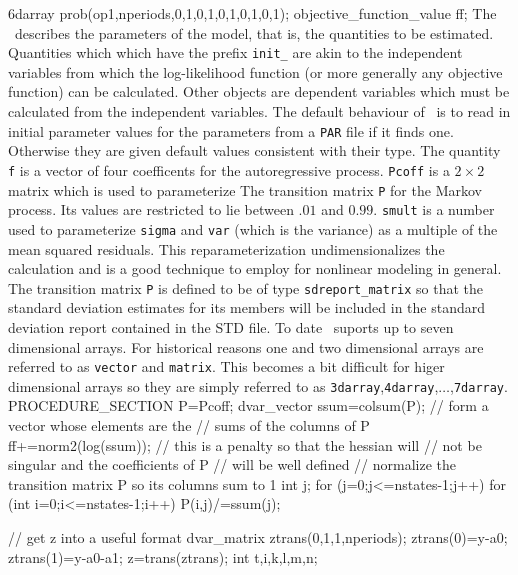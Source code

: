 \documentclass[12pt]{book}
\begin{document}
  6darray prob(op1,nperiods,0,1,0,1,0,1,0,1,0,1);
  objective_function_value ff;
\endexample
The \PS\ describes the parameters of the model, that is, the quantities
to be estimated. Quantities which which have the prefix {\tt init\_}
are akin to the independent variables from which the log-likelihood
function (or more generally any objective function) can be calculated.
Other objects are dependent variables which must be calculated from the
independent variables. The default behaviour of \ADM\ is to read in
initial parameter values for the parameters from a {\tt PAR} file if
it finds one. Otherwise they are given default values consistent with their
type.
The quantity {\tt f} is a vector of four coefficents for the autoregressive
process. {\tt Pcoff} is a $2\times 2$ matrix which is used to parameterize
The transition matrix {\tt P} for the Markov process. Its values are restricted to lie
between $.01$ and $0.99$. {\tt smult} is a number used to parameterize 
{\tt sigma} and {\tt var} (which is the variance) as a multiple of the
mean squared residuals. This reparameterization undimensionalizes the
calculation and is a good  technique to employ for nonlinear modeling
in general. The transition matrix {\tt P} is defined to be of 
type {\tt sdreport\_matrix} so that the standard deviation estimates
for its members will be included in the standard deviation report contained
in the {\tt} STD file. To date \ADM\ suports up to seven
dimensional arrays. For historical reasons one and two dimensional
arrays are referred to as {\tt vector} and  {\tt matrix}. This becomes a
bit difficult for higer dimensional arrays so they are simply referred
to as {\tt 3darray},{\tt 4darray},$\ldots$,{\tt 7darray}.
\beginexample
PROCEDURE_SECTION
  P=Pcoff;
  dvar_vector ssum=colsum(P);  // form a vector whose elements are the
                           // sums of the columns of P
  ff+=norm2(log(ssum)); // this is a penalty so that the hessian will
                        // not be singular and the coefficients of P 
                        // will be well defined
  // normalize the transition matrix P so its columns sum to 1
  int j;
  for (j=0;j<=nstates-1;j++)
  {
    for (int i=0;i<=nstates-1;i++)
    {
      P(i,j)/=ssum(j);
    }
  }  

  // get z into a useful format
  dvar_matrix ztrans(0,1,1,nperiods);
  ztrans(0)=y-a0;
  ztrans(1)=y-a0-a1;
  z=trans(ztrans);
  int t,i,k,l,m,n;
  
\end{document}
